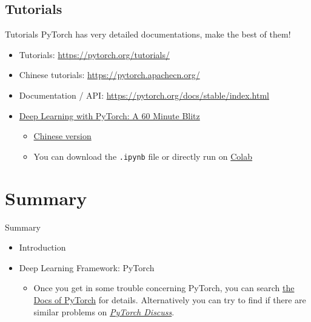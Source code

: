 \documentclass{../TexTemplate/myslide}
\begin{document}
\subsection{Tutorials}
\begin{frame}[fragile]{Tutorials}
PyTorch has very detailed documentations, make the best of them!
\begin{itemize}
	\item Tutorials: \url{https://pytorch.org/tutorials/}
	\item Chinese tutorials: \url{https://pytorch.apachecn.org/}
	\item Documentation / API: \url{https://pytorch.org/docs/stable/index.html}
	\item \href{https://pytorch.org/tutorials/beginner/deep_learning_60min_blitz.html}{Deep Learning with PyTorch: A 60 Minute Blitz}
	\begin{itemize}
		\item \href{https://pytorch.apachecn.org/docs/1.0/deep_learning_60min_blitz.html}{Chinese version}
		\item You can download the \verb'.ipynb' file or directly run on \href{https://colab.research.google.com/}{Colab}
	\end{itemize}
\end{itemize}
\end{frame}

\section{Summary}
\begin{frame}
\sectionpage
\end{frame}

\begin{frame}{Summary}
\begin{itemize}
	\item Introduction
	\item Deep Learning Framework: PyTorch
	\begin{itemize}
		\item Once you get in some trouble concerning PyTorch, you can search \href{http://pytorch.org/docs/master/index.html}{the Docs of PyTorch} for details. Alternatively you can try to find if there are similar problems on \href{https://discuss.pytorch.org/}{\emph{PyTorch Discuss}}.
	\end{itemize}
\end{itemize}
\end{frame}
\end{document}
